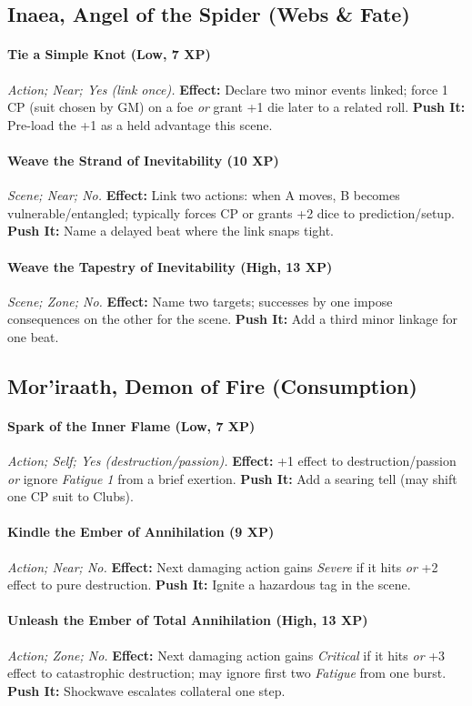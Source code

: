 \documentclass[12pt,twoside]{book}
\begin{document}
\subsection{Inaea, Angel of the Spider (Webs \& Fate)}
\paragraph{Tie a Simple Knot (Low, 7 XP)} \emph{Action; Near; Yes (link once).}
\textbf{Effect:} Declare two minor events linked; force 1 CP (suit chosen by GM) on a foe \emph{or} grant +1 die later to a related roll.
\textbf{Push It:} Pre-load the +1 as a held advantage this scene.
\paragraph{Weave the Strand of Inevitability (10 XP)} \emph{Scene; Near; No.}
\textbf{Effect:} Link two actions: when A moves, B becomes vulnerable/entangled; typically forces CP or grants +2 dice to prediction/setup.
\textbf{Push It:} Name a delayed beat where the link snaps tight.
\paragraph{Weave the Tapestry of Inevitability (High, 13 XP)} \emph{Scene; Zone; No.}
\textbf{Effect:} Name two targets; successes by one impose consequences on the other for the scene.
\textbf{Push It:} Add a third minor linkage for one beat.

\subsection{Mor’iraath, Demon of Fire (Consumption)}
\paragraph{Spark of the Inner Flame (Low, 7 XP)} \emph{Action; Self; Yes (destruction/passion).}
\textbf{Effect:} +1 effect to destruction/passion \emph{or} ignore \emph{Fatigue 1} from a brief exertion.
\textbf{Push It:} Add a searing tell (may shift one CP suit to Clubs).
\paragraph{Kindle the Ember of Annihilation (9 XP)} \emph{Action; Near; No.}
\textbf{Effect:} Next damaging action gains \emph{Severe} if it hits \emph{or} +2 effect to pure destruction.
\textbf{Push It:} Ignite a hazardous tag in the scene.
\paragraph{Unleash the Ember of Total Annihilation (High, 13 XP)} \emph{Action; Zone; No.}
\textbf{Effect:} Next damaging action gains \emph{Critical} if it hits \emph{or} +3 effect to catastrophic destruction; may ignore first two \emph{Fatigue} from one burst.
\textbf{Push It:} Shockwave escalates collateral one step.
\end{document}
